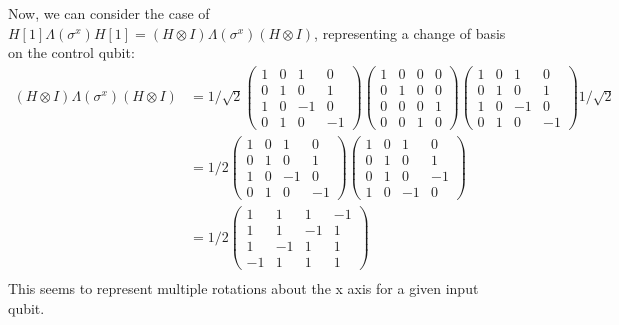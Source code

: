 \documentclass{exam} %
\theoremstyle{plain}
\theoremstyle{definition}
\theoremstyle{remark}
\newcommand{\pmat}[1]{ \begin{pmatrix} #1 \end{pmatrix} }
\numberwithin{equation}{section}  %
\newcommand{\LambdaMat}{
  \pmat{
    1&0&0&0\\
    0&1&0&0\\
    0&0&0&1\\
    0&0&1&0
  }
}
\begin{document}
\begin{questions}
\begin{solution}
    Now, we can consider the case of $H[1]\Lambda(\sigma^x)H[1] = (H\otimes I)
    \Lambda(\sigma^x)(H\otimes I)$, representing a change of basis on the 
    control qubit:
    \begin{align*}
      (H\otimes I)\Lambda(\sigma^x)(H\otimes I)
      &=
      1/\sqrt{2}
      \pmat{
        1&0&1&0\\
        0&1&0&1\\
        1&0&-1&0\\
        0&1&0&-1
      }
      \LambdaMat
      \pmat{
        1&0&1&0\\
        0&1&0&1\\
        1&0&-1&0\\
        0&1&0&-1
      }
      1/\sqrt{2}\\
      &=
      1/2
      \pmat{
        1&0&1&0\\
        0&1&0&1\\
        1&0&-1&0\\
        0&1&0&-1
      }
      \pmat{
        1&0&1&0\\
        0&1&0&1\\
        0&1&0&-1\\
        1&0&-1&0
      }\\
      &=
      1/2
      \pmat{
        1&1&1&-1\\
        1&1&-1&1\\
        1&-1&1&1\\
        -1&1&1&1
      }\\
    \end{align*}
    This seems to represent multiple rotations about the x axis for a given 
    input qubit.
  \end{solution}
\end{questions}
\end{document}
